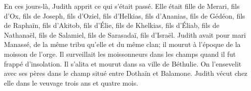 En ces jours-là, Judith apprit ce qui s'était passé.
Elle était fille de Merari, fils d'Ox, fils de Joseph, fils d'Oziel,
	fils d'Helkias, fils d'Ananias, fils de Gédéon, fils de Raphaïn,
	fils d'Akitob, fils d'Élie, fils de Khelkias, fils d'Éliab,
	fils de Nathanaël, fils de Salamiel, fils de Sarasadaï, fils d'Israël.
Judith avait pour mari Manassé, de la même tribu qu'elle et du même clan;
	il mourut à l'époque de la moisson de l'orge.
Il surveillait les moissonneurs dans les champs quand il fut frappé d'insolation.
	Il s'alita et mourut dans sa ville de Béthulie.
	On l'ensevelit avec ses pères dans le champ situé entre Dothaïn et Balamone.
Judith vécut chez elle dans le veuvage trois ans et quatre mois.
